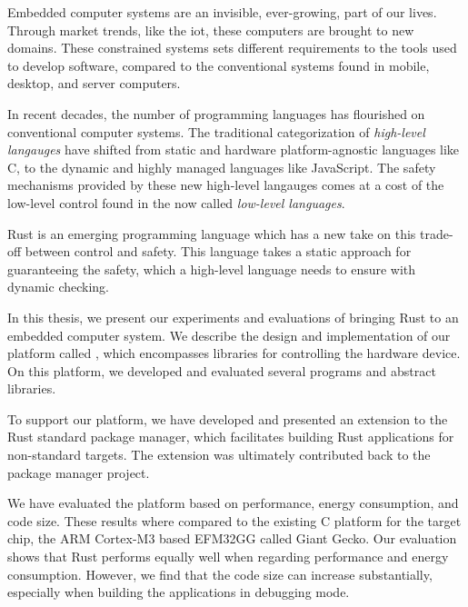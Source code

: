 
\label{chap:abstract}

Embedded computer systems are an invisible, ever-growing, part of our lives.
Through market trends, like the \glsdesc{iot}, these computers are brought to new domains.
These constrained systems sets different requirements to the tools used to develop software, compared to the conventional systems found in mobile, desktop, and server computers.

In recent decades, the number of programming languages has flourished on conventional computer systems.
The traditional categorization of \emph{high-level langauges} have shifted from static and hardware platform-agnostic languages like C, to the dynamic and highly managed languages like JavaScript.
The safety mechanisms provided by these new high-level langauges comes at a cost of the low-level control found in the now called \emph{low-level languages}.

Rust is an emerging programming language which has a new take on this trade-off between control and safety.
This language takes a static approach for guaranteeing the safety, which a high-level language needs to ensure with dynamic checking.

In this thesis, we present our experiments and evaluations of bringing Rust to an embedded computer system.
We describe the design and implementation of our  platform called {\rg}, which encompasses libraries for controlling the hardware device.
On this platform, we developed and evaluated several programs and abstract libraries.

To support our platform, we have developed and presented an extension to the Rust standard package manager, which facilitates building Rust applications for non-standard targets.
The extension was ultimately contributed back to the package manager project.

We have evaluated the platform based on performance, energy consumption, and code size.
These results where compared to the existing C platform for the target chip, the ARM Cortex-M3 based EFM32GG called Giant Gecko.
Our evaluation shows that Rust performs equally well when regarding performance and energy consumption.
However, we find that the code size can increase substantially, especially when building the applications in debugging mode.
